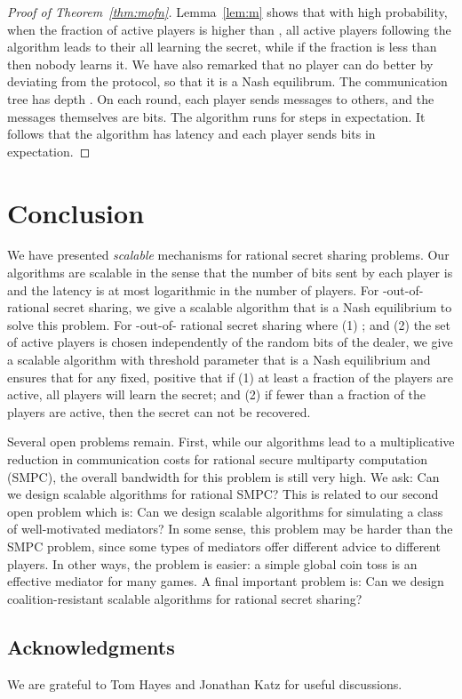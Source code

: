 \documentclass[12pt]{article}
\theoremstyle{definition}
\begin{document}
\begin{proof}[Proof of Theorem~\ref{thm:mofn}]
Lemma~\ref{lem:m} shows that with high probability, when the fraction of 
active players is higher than , all active players following 
the algorithm leads to their all learning the secret, while if the 
fraction is less than  then nobody learns it. We have also 
remarked that no player can do better by  deviating from the protocol, so 
that it is a Nash equilibrum. 
The communication tree has depth . 
On each round, each player sends messages to  others, and 
the messages  themselves are  bits. The algorithm runs 
for  steps in expectation. It follows that the algorithm has 
latency  and each player sends  bits in expectation.
\end{proof}

\section{Conclusion}
\label{s:conclusion}

We have presented \emph{scalable} mechanisms for rational secret sharing problems.  Our algorithms are scalable in the sense that the number of bits sent by each player is  and the latency is at most logarithmic in the number of players.  For -out-of- rational secret sharing, we give a scalable algorithm that is a Nash equilibrium to solve this problem.  For -out-of- rational secret sharing where (1) ; and (2) the set of active players is chosen independently of the random bits of the dealer, we give a scalable algorithm with threshold parameter  that is a Nash equilibrium and ensures that for any fixed, positive  that if (1) at least a  fraction of the players are active, all players will learn the secret; and (2) if fewer than a  fraction of the players are active, then the secret can not be recovered. 

Several open problems remain.  First, while our algorithms lead to a  multiplicative reduction in communication costs for rational secure multiparty computation (SMPC), the overall bandwidth for this problem is still very high. We ask: Can we design scalable algorithms for rational SMPC?    This is related to our second open problem which is: Can we design scalable algorithms for simulating a class of well-motivated mediators?  In some sense, this problem may be harder than the SMPC problem, since some types of mediators offer different advice to different players.  In other ways, the problem is easier: a simple global coin toss is an effective mediator for many games.  A final important problem is: Can we design coalition-resistant scalable algorithms for rational secret sharing?

\subsection*{Acknowledgments}

We are grateful to Tom Hayes and Jonathan Katz for useful discussions.







\end{document}
